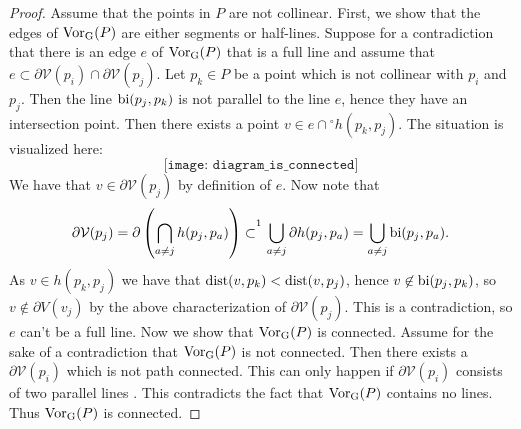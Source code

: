 \begin{proof}
Assume that the points in $P$ are not collinear. First, we show that the edges of $\operatorname{Vor_{G}}(P)$ are either segments or half-lines. Suppose for a contradiction that there is an edge $e$ of $\operatorname{Vor_{G}}(P)$ that is a full line and assume that $e \subset \partial\mathcal{V}(p_i) \cap \partial\mathcal{V}(p_j)$. Let $p_k \in P$ be a point which is not collinear with $p_i$ and $p_j$. Then the line $\operatorname{bi}(p_j, p_k)$ is not parallel to the line $e$, hence they have an intersection point. Then there exists a point $v \in e \cap {}^{\circ}h(p_k, p_j)$. The situation is visualized here:
\[
    \texttt{[image: diagram\_is\_connected]} %
\]
We have that $v \in \partial\mathcal{V}(p_j)$ by definition of $e$. Now note that
\[
    \partial \mathcal{V}(p_j) = \partial \para{\bigcap_{a \ne j} h(p_j, p_a)} \subset^{\footnotemark} \bigcup_{a \ne j} \partial h(p_j, p_a) = \bigcup_{a \ne j} \bi(p_j, p_a).
\]
As $v \in h(p_k, p_j)$ we have that $\operatorname{dist}(v, p_k) < \operatorname{dist}(v, p_j)$, hence $v \not\in \operatorname{bi}(p_j, p_k)$, so $v \not\in \partial{V}(v_j)$ by the above characterization of $\partial \mathcal{V}(p_j)$.
This is a contradiction, so $e$ can't be a full line. Now we show that $\operatorname{Vor_{G}}(P)$ is connected. Assume for the sake of a contradiction that $\operatorname{Vor_{G}}(P)$ is not connected. Then there exists a $\partial \mathcal{V}(p_i)$ which is not path connected. This can only happen if $\partial \mathcal{V}(p_i)$ consists of two parallel lines . This contradicts the fact that $\operatorname{Vor_{G}}(P)$ contains no lines. Thus $\operatorname{Vor_{G}}(P)$ is connected.
\end{proof}

